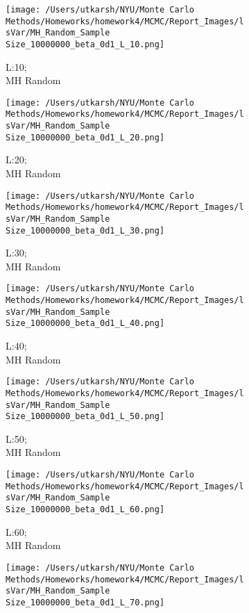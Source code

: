 \documentclass[11pt]{article}
\begin{document}
\begin{figure}[H]
	\centering
	\begin{subfigure}{.20\textwidth}
		\texttt{[image: /Users/utkarsh/NYU/Monte Carlo Methods/Homeworks/homework4/MCMC/Report\_Images/lsVar/MH\_Random\_Sample Size\_10000000\_beta\_0d1\_L\_10.png]}
		\caption{L:10;\\MH Random}
	\end{subfigure}
	\begin{subfigure}{.20\textwidth}
		\texttt{[image: /Users/utkarsh/NYU/Monte Carlo Methods/Homeworks/homework4/MCMC/Report\_Images/lsVar/MH\_Random\_Sample Size\_10000000\_beta\_0d1\_L\_20.png]}
		\caption{L:20;\\MH Random}
	\end{subfigure}
	\begin{subfigure}{.20\textwidth}
		\texttt{[image: /Users/utkarsh/NYU/Monte Carlo Methods/Homeworks/homework4/MCMC/Report\_Images/lsVar/MH\_Random\_Sample Size\_10000000\_beta\_0d1\_L\_30.png]}
		\caption{L:30;\\MH Random}
	\end{subfigure}
	\begin{subfigure}{.20\textwidth}
		\texttt{[image: /Users/utkarsh/NYU/Monte Carlo Methods/Homeworks/homework4/MCMC/Report\_Images/lsVar/MH\_Random\_Sample Size\_10000000\_beta\_0d1\_L\_40.png]}
		\caption{L:40;\\MH Random}
	\end{subfigure}
	\begin{subfigure}{.20\textwidth}
		\texttt{[image: /Users/utkarsh/NYU/Monte Carlo Methods/Homeworks/homework4/MCMC/Report\_Images/lsVar/MH\_Random\_Sample Size\_10000000\_beta\_0d1\_L\_50.png]}
		\caption{L:50;\\MH Random}
	\end{subfigure}
	\begin{subfigure}{.20\textwidth}
		\texttt{[image: /Users/utkarsh/NYU/Monte Carlo Methods/Homeworks/homework4/MCMC/Report\_Images/lsVar/MH\_Random\_Sample Size\_10000000\_beta\_0d1\_L\_60.png]}
		\caption{L:60;\\MH Random}
	\end{subfigure}
	\begin{subfigure}{.20\textwidth}
		\texttt{[image: /Users/utkarsh/NYU/Monte Carlo Methods/Homeworks/homework4/MCMC/Report\_Images/lsVar/MH\_Random\_Sample Size\_10000000\_beta\_0d1\_L\_70.png]}

\end{subfigure}
\end{figure}
\end{document}
